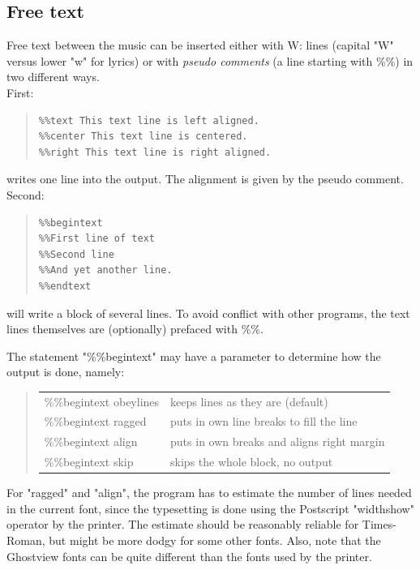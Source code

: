 \documentclass[a4paper]{article}
\begin{document}
\subsection{Free text}
 
Free text between the music can be inserted either with
W: lines (capital "W" versus lower "w" for lyrics) or with 
{\it pseudo comments} (a line starting with \%\%) in two different ways. \\
First:
\begin{quote}
\begin{verbatim}
%%text This text line is left aligned.
%%center This text line is centered.
%%right This text line is right aligned.
\end{verbatim}
\end{quote}
writes one line into the output. The alignment is given by the
pseudo comment.\\
Second:
\begin{quote}
\begin{verbatim}
%%begintext
%%First line of text
%%Second line
%%And yet another line.
%%endtext
\end{verbatim}
\end{quote}
will write a block of several lines. To avoid conflict with other
programs, the text lines themselves are (optionally) prefaced with 
\%\%.
\par
The statement "\%\%begintext" may have a parameter to determine 
how the output is done, namely: 
\begin{quote}
\begin{tabular}{ll}
\%\%begintext obeylines &  keeps lines as they are (default) \\
\%\%begintext ragged    &  puts in own line breaks to fill the line \\
\%\%begintext align     &  puts in own breaks and aligns right margin \\
\%\%begintext skip      &  skips the whole block, no output \\
\end{tabular}
\end{quote}
For "ragged" and "align", the program has to estimate the number of
lines needed in the current font, since the typesetting is done
using the Postscript "widthshow" operator by the printer. 
The estimate should be reasonably reliable for Times-Roman, but might 
be more dodgy for some other fonts. Also, note that the Ghostview fonts 
can be quite different than the fonts used by the printer.
\end{document}
